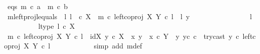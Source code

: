 \begin{isabellebody}
\ eqs{\isacharcolon}{\kern0pt}\ {\isachardoublequoteopen}m\ {\isasymcirc}\isactrlsub c\ a\ {\isacharequal}{\kern0pt}\ m\ {\isasymcirc}\isactrlsub c\ b{\isachardoublequoteclose}\isanewline
\isanewline
\ \ \ \ \ \ \isamarkupfalse%
\ m{\isacharunderscore}{\kern0pt}leftproj{\isacharunderscore}{\kern0pt}l{\isacharunderscore}{\kern0pt}equals{\isacharcolon}{\kern0pt}\ {\isachardoublequoteopen}{\isasymAnd}\ l{\isachardot}{\kern0pt}\ l\ \ {\isasymin}\isactrlsub c\ X\ {\isasymLongrightarrow}\ m\ {\isasymcirc}\isactrlsub c\ left{\isacharunderscore}{\kern0pt}coproj\ X\ Y\ {\isasymcirc}\isactrlsub c\ l\ {\isacharequal}{\kern0pt}\ {\isasymlangle}l{\isacharcomma}{\kern0pt}\ y{}{\isasymrangle}{\isachardoublequoteclose}\isanewline
\ \ \ \ \ \ \isamarkupfalse%
{\isacharminus}{\kern0pt}\isanewline
\ \ \ \ \ \ \ \ \isamarkupfalse%
\ l\ \isanewline
\ \ \ \ \ \ \ \ \isamarkupfalse%
\ l{\isacharunderscore}{\kern0pt}type{\isacharcolon}{\kern0pt}\ {\isachardoublequoteopen}l\ {\isasymin}\isactrlsub c\ X{\isachardoublequoteclose}\isanewline
\ \ \ \ \ \ \ \ \isamarkupfalse%
\ {\isachardoublequoteopen}m\ {\isasymcirc}\isactrlsub c\ left{\isacharunderscore}{\kern0pt}coproj\ X\ Y\ {\isasymcirc}\isactrlsub c\ l\ {\isacharequal}{\kern0pt}\ {\isacharparenleft}{\kern0pt}{\isasymlangle}id{\isacharparenleft}{\kern0pt}X{\isacharparenright}{\kern0pt}{\isacharcomma}{\kern0pt}\ y{}\ {\isasymcirc}\isactrlsub c\ {\isasymbeta}\isactrlbsub X\isactrlesub {\isasymrangle}\ {\isasymamalg}\ {\isacharparenleft}{\kern0pt}{\isacharparenleft}{\kern0pt}{\isasymlangle}x{}{\isacharcomma}{\kern0pt}\ y{}{\isasymrangle}\ {\isasymamalg}\ {\isasymlangle}x{}\ {\isasymcirc}\isactrlsub c\ {\isasymbeta}\isactrlbsub Y\ {\isasymsetminus}\ {\isacharparenleft}{\kern0pt}{\isasymone}{\isacharcomma}{\kern0pt}y{}{\isacharparenright}{\kern0pt}\isactrlesub {\isacharcomma}{\kern0pt}\ y{}\isactrlsup c{\isasymrangle}{\isacharparenright}{\kern0pt}\ {\isasymcirc}\isactrlsub c\ \ try{\isacharunderscore}{\kern0pt}cast\ y{}{\isacharparenright}{\kern0pt}{\isacharparenright}{\kern0pt}\ {\isasymcirc}\isactrlsub c\ left{\isacharunderscore}{\kern0pt}coproj\ X\ Y\ {\isasymcirc}\isactrlsub c\ l{\isachardoublequoteclose}\isanewline
\ \ \ \ \ \ \ \ \ \ \isamarkupfalse%
\ {\isacharparenleft}{\kern0pt}simp\ add{\isacharcolon}{\kern0pt}\ m{\isacharunderscore}{\kern0pt}def{\isacharparenright}{\kern0pt}\isanewline
\ \ \ \ \ \ \ \ \isamarkupfalse%

\end{isabellebody}
